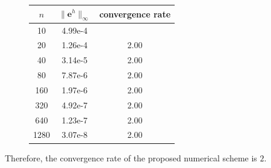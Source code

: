 \begin{sol}
\begin{figure}[H]
{  }
  \hfill
  \hfill
  \hfill
  \hfill
\end{figure}
\begin{figure}[H]
  \centering
\begin{tabular}{c|c|c}
  \centering
  $n$ & $\|\bm{e}^h\|_{\infty}$ & convergence rate
  \\ \hline
  10 & 4.99e-4 &
  \\
  20 & 1.26e-4 & 2.00
  \\
  40& 3.14e-5 & 2.00
  \\
  80 & 7.87e-6 & 2.00
  \\
  160 & 1.97e-6 & 2.00
  \\
  320 & 4.92e-7 & 2.00
  \\
  640 & 1.23e-7 & 2.00
  \\
  1280 & 3.07e-8 & 2.00
  \\ \hline
\end{tabular}
\end{figure}
Therefore,
the convergence rate of the proposed numerical scheme is $2$.
\end{sol}
